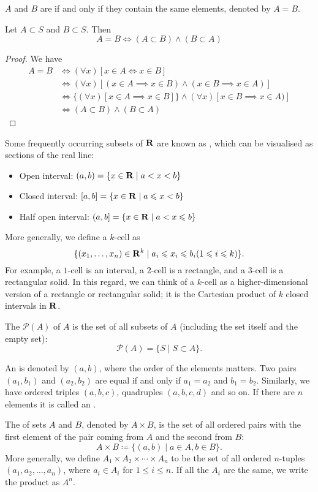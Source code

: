 $A$ and $B$ are  if and only if they contain the same elements, denoted by $A=B$. 

\begin{proposition}
Let $A\subset S$ and $B\subset S$. Then
\[A=B\iff (A\subset B)\land(B\subset A)\]
\end{proposition}

\begin{proof}
We have 
\begin{align*}
A = B &\iff (\forall x)[x \in A \iff x \in B] \\
&\iff (\forall x)[(x \in A \implies x \in B) \land (x \in B \implies x \in A)] \\
&\iff \{(\forall x)[x \in A \implies x \in B]\} \land {(\forall x)[x \in B \implies x \in A)]} \\
&\iff (A \subset B) \land (B \subset A)
\end{align*}
\end{proof}

Some frequently occurring subsets of $\mathbf R$ are known as , which can be visualised as sections of the real line:
\begin{itemize}
\item Open interval: $(a,b)=\{x\in\mathbf R \mid a<x<b\}$
\item Closed interval: $[a,b]=\{x\in\mathbf R \mid a\leqslant x<b\}$
\item Half open interval: $(a,b]=\{x\in\mathbf R \mid a<x\leqslant b\}$
\end{itemize}
More generally, we define a $k$-cell as
\[\{(x_1,\dots,x_n)\in\mathbf R^k\mid a_i\leqslant x_i\leqslant b_i (1\leqslant i\leqslant k)\}.\]
For example, a $1$-cell is an interval, a $2$-cell is a rectangle, and a $3$-cell is a rectangular solid. In this regard, we can think of a $k$-cell as a higher-dimensional version of a rectangle or rectangular solid; it is the Cartesian product of $k$ closed intervals in $\mathbf R$.

The  $\mathcal{P}(A)$ of $A$ is the set of all subsets of $A$ (including the set itself and the empty set):
\[\mathcal{P}(A)=\{S\mid S\subset A\}.\]

An  is denoted by $(a,b)$, where the order of the elements matters. Two pairs $(a_1,b_1)$ and $(a_2,b_2)$ are equal if and only if $a_1=a_2$ and $b_1=b_2$.  Similarly, we have ordered triples $(a,b,c)$, quadruples $(a,b,c,d)$ and so on. If there are $n$ elements it is called an .

The  of sets $A$ and $B$, denoted by $A \times B$, is the set of all ordered pairs with the first element of the pair coming from $A$ and the second from $B$:
\[A\times B\coloneqq\{(a,b)\mid a\in A,b\in B\}.\]
More generally, we define $A_1 \times A_2 \times \cdots \times A_n$ to be the set of all ordered $n$-tuples $(a_1, a_2, \dots, a_n)$, where $a_i \in A_i$ for $1 \le i \le n$. If all the $A_i$ are the same, we write the product as $A^n$.

